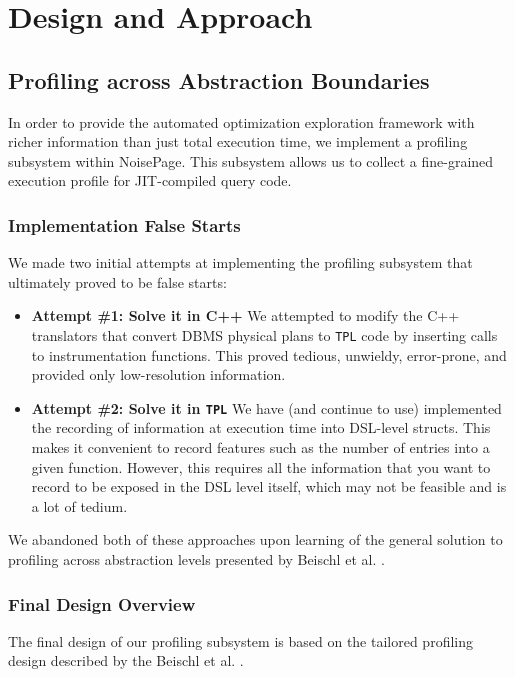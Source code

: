 \documentclass{vldb}
\newcommand{\tpl}{\texttt{TPL}\xspace}
\begin{document}
\section{Design and Approach}

\subsection{Profiling across Abstraction Boundaries}

In order to provide the automated optimization exploration framework with richer information than just total execution time, we implement a profiling subsystem within NoisePage. This subsystem allows us to collect a fine-grained execution profile for JIT-compiled query code.

\subsubsection{Implementation False Starts}

We made two initial attempts at implementing the profiling subsystem that ultimately proved to be false starts:

\begin{itemize}
    \item \textbf{Attempt \#1: Solve it in C++} We attempted to modify the C++ translators that convert DBMS physical plans to \tpl code by inserting calls to instrumentation functions. This proved tedious, unwieldy, error-prone, and provided only low-resolution information. 
    \item \textbf{Attempt \#2: Solve it in \tpl} We have (and continue to use) implemented the recording of information at execution time into DSL-level structs. This makes it convenient to record features such as the number of entries into a given function. However, this requires all the information that you want to record to be exposed in the DSL level itself, which may not be feasible and is a lot of tedium.
\end{itemize}

We abandoned both of these approaches upon learning of the general solution to profiling across abstraction levels presented by Beischl et al. \cite{beischl21}.

\subsubsection{Final Design Overview}

The final design of our profiling subsystem is based on the tailored profiling design described by the Beischl et al. \cite{beischl21}.
\end{document}
